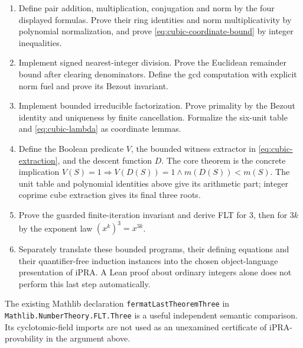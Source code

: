 \begin{enumerate}
\item Define pair addition, multiplication, conjugation and norm by the
four displayed formulas.  Prove their ring identities and norm
multiplicativity by polynomial normalization, and prove
\eqref{eq:cubic-coordinate-bound} by integer inequalities.
\item Implement signed nearest-integer division.  Prove the Euclidean
remainder bound after clearing denominators.  Define the gcd computation
with explicit norm fuel and prove its Bezout invariant.
\item Implement bounded irreducible factorization.  Prove primality by
the Bezout identity and uniqueness by finite cancellation.  Formalize
the six-unit table and \eqref{eq:cubic-lambda} as coordinate lemmas.
\item Define the Boolean predicate $V$, the bounded witness extractor
in \eqref{eq:cubic-extraction}, and the descent function $D$.  The
core theorem is the concrete implication
$V(S)=1\Rightarrow V(D(S))=1\land m(D(S))<m(S)$.
The unit table and polynomial identities above give its arithmetic
part; integer coprime cube extraction gives its final three roots.
\item Prove the guarded finite-iteration invariant and derive FLT for
$3$, then for $3k$ by the exponent law $(x^k)^3=x^{3k}$.
\item Separately translate these bounded programs, their defining
equations and their quantifier-free induction instances into the
chosen object-language presentation of iPRA.  A Lean proof about
ordinary integers alone does not perform this last step automatically.
\end{enumerate}

The existing Mathlib declaration
\texttt{fermatLastTheoremThree} in
\nolinkurl{Mathlib.NumberTheory.FLT.Three} is a useful independent
semantic comparison.  Its cyclotomic-field imports are not used as an
unexamined certificate of iPRA-provability in the argument above.
